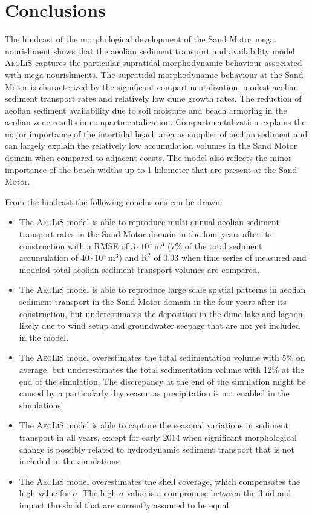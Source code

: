 \documentclass[preprint,12pt,authoryear]{elsarticle}
\begin{document}
\section{Conclusions}

The hindcast of the morphological development of the Sand Motor mega
nourishment shows that the aeolian sediment transport and availability
model \textsc{AeoLiS} captures the particular supratidal morphodynamic
behaviour associated with mega nourishments. The supratidal
morphodynamic behaviour at the Sand Motor is characterized by the
significant compartmentalization, modest aeolian sediment transport
rates and relatively low dune growth rates. The reduction of aeolian
sediment availability due to soil moisture and beach armoring in the
aeolian zone results in compartmentalization.  Compartmentalization
explains the major importance of the intertidal beach area as supplier
of aeolian sediment and can largely explain the relatively low
accumulation volumes in the Sand Motor domain when compared to
adjacent coasts. The model also reflects the minor importance of the
beach widths up to 1 kilometer that are present at the Sand Motor.

\bigskip

\noindent From the hindcast the following conclusions can be drawn:

\begin{itemize}
\item The \textsc{AeoLiS} model is able to reproduce multi-annual
  aeolian sediment transport rates in the Sand Motor domain in the
  four years after its construction with a RMSE of $3 \cdot 10^4 ~
  \mathrm{m^3}$ (7\% of the total sediment accumulation of $40 \cdot
  10^4 ~ \mathrm{m^3}$) and $\mathrm{R^2}$ of 0.93 when time series of
  measured and modeled total aeolian sediment transport volumes are
  compared.
\item The \textsc{AeoLiS} model is able to reproduce large scale
  spatial patterns in aeolian sediment transport in the Sand Motor
  domain in the four years after its construction, but underestimates
  the deposition in the dune lake and lagoon, likely due to wind setup
  and groundwater seepage that are not yet included in the model.
\item The \textsc{AeoLiS} model overestimates the total sedimentation
  volume with 5\% on average, but underestimates the total
  sedimentation volume with 12\% at the end of the simulation. The
  discrepancy at the end of the simulation might be caused by a
  particularly dry season as precipitation is not enabled in the
  simulations.
\item The \textsc{AeoLiS} model is able to capture the seasonal
  variations in sediment transport in all years, except for early 2014
  when significant morphological change is possibly related to
  hydrodynamic sediment transport that is not included in the
  simulations.
\item The \textsc{AeoLiS} model overestimates the shell coverage,
  which compensates the high value for $\sigma$. The high $\sigma$
  value is a compromise between the fluid and impact threshold that
  are currently assumed to be equal.
\end{itemize}
\end{document}
